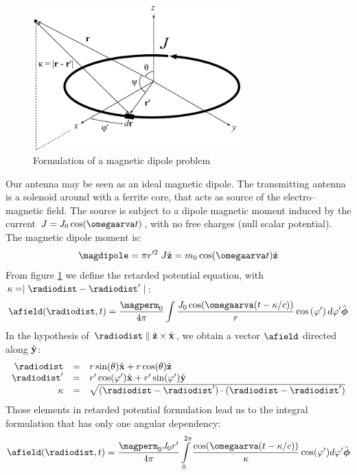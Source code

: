\begin{figure}[h]
	\centering
	\includegraphics[width=8cm]{ch2/img/dipolo_magnetico.pdf}
	\caption{Formulation of a magnetic dipole problem}
	\label{eq:dipolomagnetico}
	\forceversofloat
\end{figure}
Our antenna may be seen as an ideal magnetic dipole. The transmitting antenna is a solenoid around with a ferrite core, that acts as source of the electro--magnetic field. The source is subject to a dipole magnetic moment induced by the current $J = J_0 \cos(\omegaarva t)$, with no free charges (null scalar potential). The magnetic dipole moment is:
\begin{equation}
\magdipole = \pi r'^2\; J \vrz = m_0 \cos(\omegaarva t) \vrz
\label{eq:dipolodacorrente}
\end{equation}
From figure \ref{eq:dipolomagnetico} we define the retarded potential equation, with $\kappa = \mid \radiodist-\radiodist'\mid$:
\[
\afield(\radiodist,t) = \dfrac{\magperm_0}{4\pi}\int{\dfrac{J_0\cos(\omegaarva (t - \kappa/c))}{r}\ccos{\varphi'}d\varphi'}\hat{\boldsymbol{\phi}}
\]
In the hypothesis of $\radiodist\parallel\vrz\times\vrx$, we obtain a vector $\afield$ directed along $\hat{\mathbf{y}}$:
\[\begin{array}{rcl}
\radiodist & = & r \sin(\theta) \vrx + r \cos(\theta) \vrz \\
\radiodist' & = & r' \cos(\varphi') \vrx + r' \sin(\varphi') \vry \\
\kappa & = & \sqrt{(\radiodist - \radiodist')\cdot(\radiodist - \radiodist')}
\end{array}\]
Those elements in retarded potential formulation lead us to the integral formulation that has only one angular dependency:
\begin{equation}
\label{eq:integraledacalc}
\afield(\radiodist,t) = \dfrac{\magperm_0 J_0 r'}{4\pi}\int\limits_{0}^{2\pi}{\dfrac{\cos(\omegaarva (t - \kappa/c))}{\kappa} \cos(\varphi') d\varphi' \hat{\boldsymbol{\phi}}}
\end{equation}
